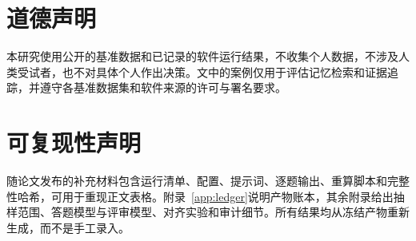\section*{道德声明}

本研究使用公开的基准数据和已记录的软件运行结果，不收集个人数据，不涉及人类受试者，也不对具体个人作出决策。文中的案例仅用于评估记忆检索和证据追踪，并遵守各基准数据集和软件来源的许可与署名要求。

\section*{可复现性声明}

随论文发布的补充材料包含运行清单、配置、提示词、逐题输出、重算脚本和完整性哈希，可用于重现正文表格。附录~\ref{app:ledger}说明产物账本，其余附录给出抽样范围、答题模型与评审模型、对齐实验和审计细节。所有结果均从冻结产物重新生成，而不是手工录入。
